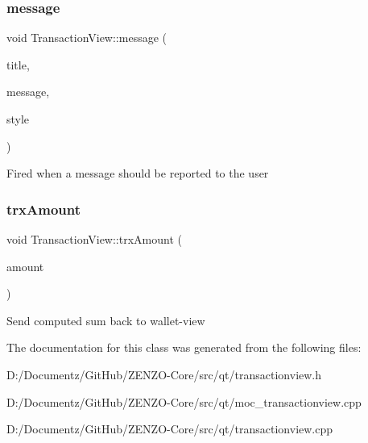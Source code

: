 \subsubsection{\texorpdfstring{message}{message}}
{\footnotesize\ttfamily void Transaction\+View\+::message (\begin{DoxyParamCaption}\item[{const Q\+String \&}]{title,  }\item[{const Q\+String \&}]{message,  }\item[{unsigned int}]{style }\end{DoxyParamCaption})\hspace{0.3cm}{\ttfamily [signal]}}

Fired when a message should be reported to the user \mbox{\label{class_transaction_view_a139ef5288ce13ce14c17907b4d80c0e8}} 
\subsubsection{\texorpdfstring{trxAmount}{trxAmount}}
{\footnotesize\ttfamily void Transaction\+View\+::trx\+Amount (\begin{DoxyParamCaption}\item[{Q\+String}]{amount }\end{DoxyParamCaption})\hspace{0.3cm}{\ttfamily [signal]}}

Send computed sum back to wallet-\/view 

The documentation for this class was generated from the following files\+:\begin{DoxyCompactItemize}
\item 
D\+:/\+Documentz/\+Git\+Hub/\+Z\+E\+N\+Z\+O-\/\+Core/src/qt/transactionview.\+h\item 
D\+:/\+Documentz/\+Git\+Hub/\+Z\+E\+N\+Z\+O-\/\+Core/src/qt/moc\+\_\+transactionview.\+cpp\item 
D\+:/\+Documentz/\+Git\+Hub/\+Z\+E\+N\+Z\+O-\/\+Core/src/qt/transactionview.\+cpp\end{DoxyCompactItemize}
